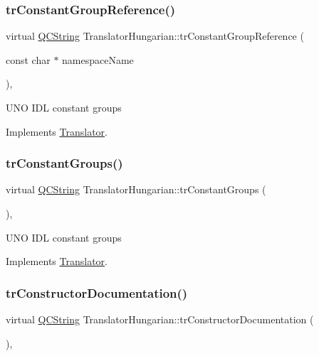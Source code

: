 \subsubsection{\texorpdfstring{trConstantGroupReference()}{trConstantGroupReference()}}
{\footnotesize\ttfamily virtual \mbox{\hyperlink{class_q_c_string}{Q\+C\+String}} Translator\+Hungarian\+::tr\+Constant\+Group\+Reference (\begin{DoxyParamCaption}\item[{const char $\ast$}]{namespace\+Name }\end{DoxyParamCaption})\hspace{0.3cm}{\ttfamily [inline]}, {\ttfamily [virtual]}}

U\+NO I\+DL constant groups 

Implements \mbox{\hyperlink{class_translator}{Translator}}.

\mbox{\label{class_translator_hungarian_a2e83cab89caebec82a9e03940421b407}} 
\subsubsection{\texorpdfstring{trConstantGroups()}{trConstantGroups()}}
{\footnotesize\ttfamily virtual \mbox{\hyperlink{class_q_c_string}{Q\+C\+String}} Translator\+Hungarian\+::tr\+Constant\+Groups (\begin{DoxyParamCaption}{ }\end{DoxyParamCaption})\hspace{0.3cm}{\ttfamily [inline]}, {\ttfamily [virtual]}}

U\+NO I\+DL constant groups 

Implements \mbox{\hyperlink{class_translator}{Translator}}.

\mbox{\label{class_translator_hungarian_a528a34a3d077a2204cb1758d88a878e6}} 
\subsubsection{\texorpdfstring{trConstructorDocumentation()}{trConstructorDocumentation()}}
{\footnotesize\ttfamily virtual \mbox{\hyperlink{class_q_c_string}{Q\+C\+String}} Translator\+Hungarian\+::tr\+Constructor\+Documentation (\begin{DoxyParamCaption}{ }\end{DoxyParamCaption})\hspace{0.3cm}{\ttfamily [inline]}, {\ttfamily [virtual]}}

